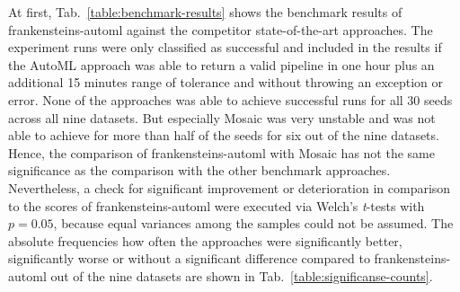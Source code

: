 At first, Tab.~\ref{table:benchmark-results} shows the benchmark results of frankensteins-automl against the competitor state-of-the-art approaches.
The experiment runs were only classified as successful and included in the results if the AutoML approach was able to return a valid pipeline in one hour plus an additional 15 minutes range of tolerance and without throwing an exception or error.\newline
None of the approaches was able to achieve successful runs for all 30 seeds across all nine datasets.
But especially Mosaic was very unstable and was not able to achieve for more than half of the seeds for six out of the nine datasets.
Hence, the comparison of frankensteins-automl with Mosaic has not the same significance as the comparison with the other benchmark approaches.\newline
Nevertheless, a check for significant improvement or deterioration in comparison to the scores of frankensteins-automl were executed via Welch's \textit{t}-tests with $p = 0.05$, because equal variances among the samples could not be assumed.
The absolute frequencies how often the approaches were significantly better, significantly worse or without a significant difference compared to frankensteins-automl out of the nine datasets are shown in Tab.~\ref{table:significanse-counts}.

